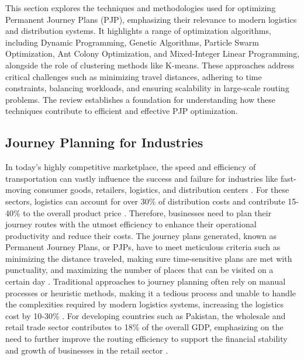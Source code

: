 This section explores the techniques and methodologies used for optimizing Permanent Journey Plans (PJP), emphasizing their relevance to modern logistics and distribution systems. It highlights a range of optimization algorithms, including Dynamic Programming, Genetic Algorithms, Particle Swarm Optimization, Ant Colony Optimization, and Mixed-Integer Linear Programming, alongside the role of clustering methods like K-means. These approaches address critical challenges such as minimizing travel distances, adhering to time constraints, balancing workloads, and ensuring scalability in large-scale routing problems. The review establishes a foundation for understanding how these techniques contribute to efficient and effective PJP optimization.

\subsection{Journey Planning for Industries}
In today’s highly competitive marketplace, the speed and efficiency of transportation can vastly influence the success and failure for industries like fast-moving consumer goods, retailers, logistics, and distribution centers \cite{corona2022cumulative}. For these sectors, logistics can
account for over 30\% of distribution costs and contribute 15-40\% to the overall product price \cite{Cui_2012a}. Therefore, businesses need to plan their journey routes with the utmost efficiency to enhance their operational productivity and reduce their costs. The journey plans generated, known as Permanent Journey Plans, or PJPs, have to meet meticulous criteria such as minimizing the distance traveled, making sure time-sensitive plans are met with punctuality, and maximizing the number of places that can be visited on a certain day \cite{Sandhya_Goel_2018}. Traditional approaches to journey planning often rely on manual processes or heuristic methods, making it a tedious process and unable to handle the complexities required by modern logistics systems,  increasing the logistics cost by 10-30\% \cite{Maini_Goel_2017, Alexis_2023}. For developing countries such as Pakistan, the wholesale and retail trade sector contributes to 18\% of the overall GDP, emphasizing on the need to further improve the routing efficiency to support the financial stability and growth of businesses in the retail sector \cite{javed2023undocumented}.

